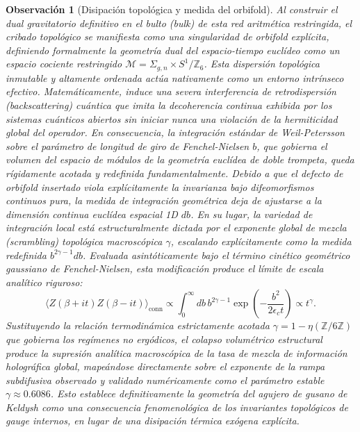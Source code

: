 \documentclass[aps,prl,preprint,superscriptaddress,floatfix]{revtex4-2}
\newtheorem{remark}[theorem]{Observación}
\newcommand{\Zmod}{\mathbb{Z}/6\mathbb{Z}}
\begin{document}
\begin{remark}[Disipación topológica y medida del orbifold]
\label{rem:keldysh}
Al construir el dual gravitatorio definitivo en el bulto (\textit{bulk}) de esta red aritmética restringida, el cribado topológico se manifiesta como una singularidad de orbifold explícita, definiendo formalmente la geometría dual del espacio-tiempo euclídeo como un espacio cociente restringido $\mathcal{M} = \Sigma_{g,n} \times S^1 / \mathbb{Z}_6$. Esta dispersión topológica inmutable y altamente ordenada actúa nativamente como un entorno intrínseco efectivo. Matemáticamente, induce una severa interferencia de retrodispersión (\textit{backscattering}) cuántica que imita la decoherencia continua exhibida por los sistemas cuánticos abiertos sin iniciar nunca una violación de la hermiticidad global del operador. En consecuencia, la integración estándar de Weil-Petersson sobre el parámetro de longitud de giro de Fenchel-Nielsen $b$, que gobierna el volumen del espacio de módulos de la geometría euclídea de doble trompeta, queda rígidamente acotada y redefinida fundamentalmente. Debido a que el defecto de orbifold insertado viola explícitamente la invarianza bajo difeomorfismos continuos pura, la medida de integración geométrica deja de ajustarse a la dimensión continua euclídea espacial 1D $db$. En su lugar, la variedad de integración local está estructuralmente dictada por el exponente global de mezcla (\textit{scrambling}) topológica macroscópica $\gamma$, escalando explícitamente como la medida redefinida $b^{2\gamma - 1} db$. Evaluada asintóticamente bajo el término cinético geométrico gaussiano de Fenchel-Nielsen, esta modificación produce el límite de escala analítico riguroso:
\begin{equation}
\langle Z(\beta + it) Z(\beta - it) \rangle_{\text{conn}} \propto \int_0^\infty db \, b^{2\gamma-1} \exp\left(-\frac{b^2}{2 \epsilon_c t}\right) \propto t^{\gamma}.
\end{equation}
Sustituyendo la relación termodinámica estrictamente acotada $\gamma = 1 - \eta(\Zmod)$ que gobierna los regímenes no ergódicos, el colapso volumétrico estructural produce la supresión analítica macroscópica de la tasa de mezcla de información holográfica global, mapeándose directamente sobre el exponente de la rampa subdifusiva observado y validado numéricamente como el parámetro estable $\gamma \approx 0.6086$. Esto establece definitivamente la geometría del agujero de gusano de Keldysh como una consecuencia fenomenológica de los invariantes topológicos de gauge internos, en lugar de una disipación térmica exógena explícita.


\end{remark}
\end{document}
